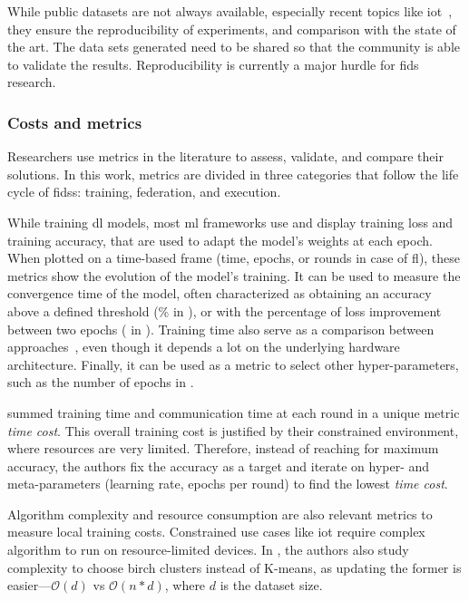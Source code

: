 While public datasets are not always available, especially recent topics like \gls{iot}~\cite{nguyen_DIoTFederatedSelflearning_2019}, they ensure the reproducibility of experiments, and comparison with the state of the art.
The data sets generated need to be shared so that the community is able to validate the results.
Reproducibility is currently a major hurdle for \gls{fids} research.


\subsubsection{Costs and metrics}
\label{sec:sota.quali.metrics}

Researchers use metrics in the literature to assess, validate, and compare their solutions.
In this work, metrics are divided in three categories that follow the life cycle of \glspl{fids}: training, federation, and execution.

While training \gls{dl} models, most \gls{ml} frameworks use and display training loss and training accuracy, that are used to adapt the model's weights at each epoch.
When plotted on a time-based frame (time, epochs, or rounds in case of \gls{fl}), these metrics show the evolution of the model's training.
It can be used to measure the convergence time of the model, often characterized as obtaining an accuracy above a defined threshold (\% in \cite{chen_Networkanomalydetection_2020b}), or with the percentage of loss improvement between two epochs ( in \cite{kim_CollaborativeAnomalyDetection_2020}). Training time also serve as a comparison between approaches~\cite{schneble_Attackdetectionusing_2019}, even though it depends a lot on the underlying hardware architecture. Finally, it can be used as a metric to select other hyper-parameters, such as the number of epochs in \cite{liu_BlockchainFederatedLearning_2021}.

\textcite{li_DeepFedFederatedDeep_2020b} summed training time and communication time at each round in a unique metric \emph{time cost}.
This overall training cost is justified by their constrained environment, where resources are very limited.
Therefore, instead of reaching for maximum accuracy, the authors fix the accuracy as a target and iterate on hyper- and meta-parameters (\eg learning rate, epochs per round) to find the lowest \emph{time cost}.


Algorithm complexity and resource consumption are also relevant metrics to measure local training costs.
Constrained use cases like \gls{iot} require complex algorithm to run on resource-limited devices.
In \cite{pahl_AllEyesYou_2018}, the authors also study complexity to choose \gls{birch} clusters instead of K-means, as updating the former is easier---\(\mathcal{O}(d)\) vs \(\mathcal{O}(n*d)\), where \(d\) is the dataset size.

